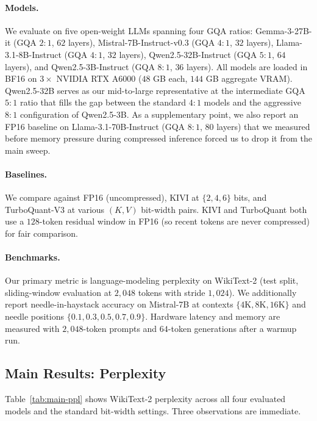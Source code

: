 \documentclass[11pt]{article}
\begin{document}
\paragraph{Models.} We evaluate on five open-weight LLMs spanning four GQA ratios: Gemma-3-27B-it (GQA $2{:}1$, $62$ layers), Mistral-7B-Instruct-v0.3 (GQA $4{:}1$, $32$ layers), Llama-3.1-8B-Instruct (GQA $4{:}1$, $32$ layers), Qwen2.5-32B-Instruct (GQA $5{:}1$, $64$ layers), and Qwen2.5-3B-Instruct (GQA $8{:}1$, $36$ layers). All models are loaded in BF16 on $3\times$ NVIDIA RTX A6000 ($48$ GB each, $144$ GB aggregate VRAM). Qwen2.5-32B serves as our mid-to-large representative at the intermediate GQA $5{:}1$ ratio that fills the gap between the standard $4{:}1$ models and the aggressive $8{:}1$ configuration of Qwen2.5-3B. As a supplementary point, we also report an FP16 baseline on Llama-3.1-70B-Instruct (GQA $8{:}1$, $80$ layers) that we measured before memory pressure during compressed inference forced us to drop it from the main sweep.

\paragraph{Baselines.} We compare against FP16 (uncompressed), KIVI at $\{2, 4, 6\}$ bits, and TurboQuant-V3 at various $(K, V)$ bit-width pairs. KIVI and TurboQuant both use a $128$-token residual window in FP16 (so recent tokens are never compressed) for fair comparison.

\paragraph{Benchmarks.} Our primary metric is language-modeling perplexity on WikiText-2 (test split, sliding-window evaluation at $2{,}048$ tokens with stride $1{,}024$). We additionally report needle-in-haystack accuracy on Mistral-7B at contexts $\{4\mathrm{K}, 8\mathrm{K}, 16\mathrm{K}\}$ and needle positions $\{0.1, 0.3, 0.5, 0.7, 0.9\}$. Hardware latency and memory are measured with $2{,}048$-token prompts and $64$-token generations after a warmup run.

\subsection{Main Results: Perplexity}
\label{sec:main-ppl}

Table~\ref{tab:main-ppl} shows WikiText-2 perplexity across all four evaluated models and the standard bit-width settings. Three observations are immediate.
\end{document}
